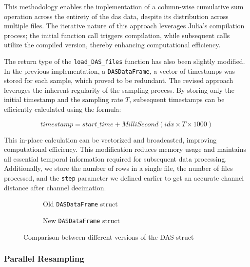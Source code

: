 This methodology enables the implementation of a column-wise cumulative sum operation across the entirety of the \acrshort{das} data, despite its distribution across multiple files. The iterative nature of this approach leverages Julia's compilation process; the initial function call triggers compilation, while subsequent calls utilize the compiled version, thereby enhancing computational efficiency.

The return type of the \texttt{load\_DAS\_files} function has also been slightly modified. In the previous implementation, a \texttt{DASDataFrame}, a vector of timestamps was stored for each sample, which proved to be redundant. The revised approach leverages the inherent regularity of the sampling process. By storing only the initial timestamp and the sampling rate $T$, subsequent timestamps can be efficiently calculated using the formula:

$$timestamp = start\_time + MilliSecond(idx \times T \times 1000)$$

This in-place calculation can be vectorized and broadcasted, improving computational efficiency. This modification reduces memory usage and maintains all essential temporal information required for subsequent data processing. Additionally, we store the number of rows in a single file, the number of files processed, and the \texttt{step} parameter we defined earlier to get an accurate channel distance after channel decimation.\\

\begin{figure}[!h]
\centering
\begin{subfigure}{.45\textwidth}
  \centering
  
  \caption{Old \texttt{DASDataFrame} struct}
  \label{fig:olddasstc}
\end{subfigure}%
\hfill
\begin{subfigure}{.45\textwidth}
  \centering
  
  \caption{New \texttt{DASDataFrame} struct}
  \label{fig:newdasstc}
\end{subfigure}
\caption{Comparison between different versions of the DAS struct}
\label{fig:dasstccmp}
\end{figure}



\subsubsection{Parallel Resampling}


